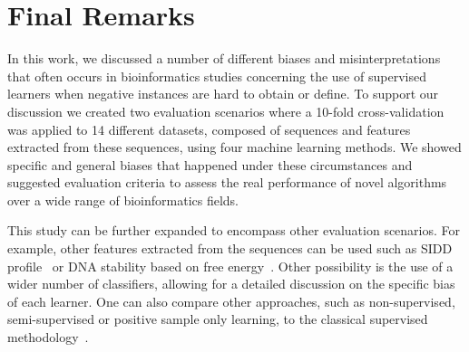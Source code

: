 \documentclass[conference]{IEEEtran}
\begin{document}
\section{Final Remarks}

In this work, we discussed a number of different biases and misinterpretations that often occurs in bioinformatics studies concerning the use of supervised learners when negative instances are hard to obtain or define. To support our discussion we created two evaluation scenarios where a 10-fold cross-validation was applied to 14 different datasets, composed of sequences and features extracted from these sequences, using four machine learning methods. We showed specific and general biases that happened under these circumstances and suggested evaluation criteria to assess the real performance of novel algorithms over a wide range of bioinformatics fields.

This study can be further expanded to encompass other evaluation scenarios. For example, other features extracted from the sequences can be used such as SIDD profile~\cite{bland2010} or DNA stability based on free energy~\cite{avila2011}. Other possibility is the use of a wider number of classifiers, allowing for a detailed discussion on the specific bias of each learner. One can also compare other approaches, such as non-supervised, semi-supervised or positive sample only learning, to the classical supervised methodology~\cite{cerulo2010,wang2006,yousef2008}.

\def\V{\rm vol.~}
\def\N{no.~}
\def\pp{pp.~}
\def\Pot{\it Proc. }
\def\IJCNN{\it International Joint Conference on Neural Networks\rm }
\def\ACC{\it American Control Conference\rm }
\def\SMC{\it IEEE Trans. Systems\rm , \it Man\rm , and \it Cybernetics\rm }
\def\handb{ \it Handbook of Intelligent Control: Neural\rm , \it
    Fuzzy\rm , \it and Adaptive Approaches \rm }


\end{document}
